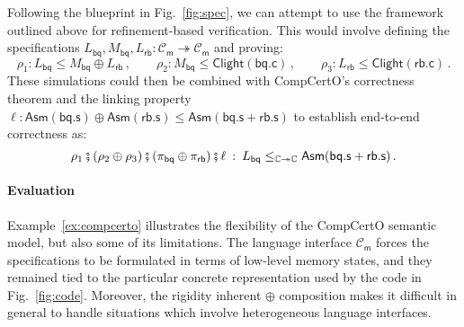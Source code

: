 \documentclass[acmsmall,screen,review,anonymous]{acmart}
\newcommand{\kw}[1]{\ensuremath{ \mathsf{#1} }}
\newcommand{\vcomp}{\fatsemi}
\begin{document}

\begin{example} \label{ex:compcerto} %
Following the blueprint in Fig.~\ref{fig:spec},
we can attempt to use the framework outlined above
for refinement-based verification.
This would involve defining the specifications
$L_\kw{bq}, M_\kw{bq}, L_\kw{rb} :
 \mathcal{C}_\kw{m} \twoheadrightarrow \mathcal{C}_\kw{m}$
and proving:
\[
  \rho_1 :
  L_\kw{bq} \le M_\kw{bq} \oplus L_\kw{rb}
  \,, \qquad
  \rho_2 :
  M_\kw{bq} \le \kw{Clight}(\kw{bq.c})
  \,, \qquad
  \rho_3 :
  L_\kw{rb} \le \kw{Clight}(\kw{rb.c})
  \,.
\]
These simulations could then be combined with
CompCertO's correctness theorem and the linking property
$
  \ell :
    \kw{Asm}(\kw{bq.s}) \oplus \kw{Asm}(\kw{rb.s})
    \le
    \kw{Asm}(\kw{bq.s} + \kw{rb.s})
$
to establish end-to-end correctness as:
\[
  \rho_1 \vcomp (\rho_2 \oplus \rho_3) \vcomp (\pi_\kw{bq} \oplus \pi_\kw{rb}) \vcomp \ell
  \::\:
  L_\kw{bq}
    \le_{\mathbb{C} \twoheadrightarrow \mathbb{C}}
    \kw{Asm}(\kw{bq.s} + \kw{rb.s})
  \,.
\]
\end{example}

\paragraph{Evaluation} %

Example~\ref{ex:compcerto}
illustrates the flexibility of the CompCertO semantic model,
but also some of its limitations.
The language interface $\mathcal{C}_\kw{m}$
forces the specifications
to be formulated in terms of low-level memory states,
and they remained tied to the particular concrete representation
used by the code in Fig.~\ref{fig:code}.
Moreover,
the rigidity inherent $\oplus$ composition
makes it difficult in general
to handle situations which involve heterogeneous language interfaces.


\end{document}
